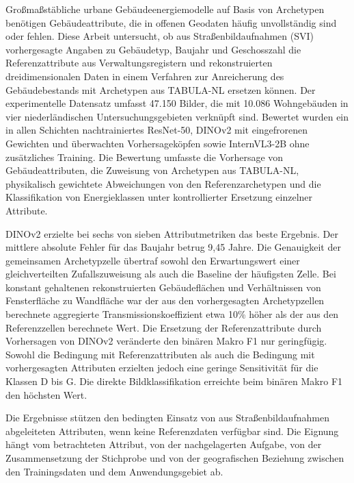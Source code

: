 Großmaßstäbliche urbane Gebäudeenergiemodelle auf Basis von Archetypen benötigen Gebäudeattribute, die in offenen Geodaten häufig unvollständig sind oder fehlen. Diese Arbeit untersucht, ob aus Straßenbildaufnahmen (SVI) vorhergesagte Angaben zu Gebäudetyp, Baujahr und Geschosszahl die Referenzattribute aus Verwaltungsregistern und rekonstruierten dreidimensionalen Daten in einem Verfahren zur Anreicherung des Gebäudebestands mit Archetypen aus TABULA-NL ersetzen können. Der experimentelle Datensatz umfasst 47.150 Bilder, die mit 10.086 Wohngebäuden in vier niederländischen Untersuchungsgebieten verknüpft sind. Bewertet wurden ein in allen Schichten nachtrainiertes ResNet-50, DINOv2 mit eingefrorenen Gewichten und überwachten Vorhersageköpfen sowie InternVL3-2B ohne zusätzliches Training. Die Bewertung umfasste die Vorhersage von Gebäudeattributen, die Zuweisung von Archetypen aus TABULA-NL, physikalisch gewichtete Abweichungen von den Referenzarchetypen und die Klassifikation von Energieklassen unter kontrollierter Ersetzung einzelner Attribute.

DINOv2 erzielte bei sechs von sieben Attributmetriken das beste Ergebnis. Der mittlere absolute Fehler für das Baujahr betrug 9,45 Jahre. Die Genauigkeit der gemeinsamen Archetypzelle übertraf sowohl den Erwartungswert einer gleichverteilten Zufallszuweisung als auch die Baseline der häufigsten Zelle. Bei konstant gehaltenen rekonstruierten Gebäudeflächen und Verhältnissen von Fensterfläche zu Wandfläche war der aus den vorhergesagten Archetypzellen berechnete aggregierte Transmissionskoeffizient etwa 10\% höher als der aus den Referenzzellen berechnete Wert. Die Ersetzung der Referenzattribute durch Vorhersagen von DINOv2 veränderte den binären Makro F1 nur geringfügig. Sowohl die Bedingung mit Referenzattributen als auch die Bedingung mit vorhergesagten Attributen erzielten jedoch eine geringe Sensitivität für die Klassen D bis G. Die direkte Bildklassifikation erreichte beim binären Makro F1 den höchsten Wert.

Die Ergebnisse stützen den bedingten Einsatz von aus Straßenbildaufnahmen abgeleiteten Attributen, wenn keine Referenzdaten verfügbar sind. Die Eignung hängt vom betrachteten Attribut, von der nachgelagerten Aufgabe, von der Zusammensetzung der Stichprobe und von der geografischen Beziehung zwischen den Trainingsdaten und dem Anwendungsgebiet ab.
